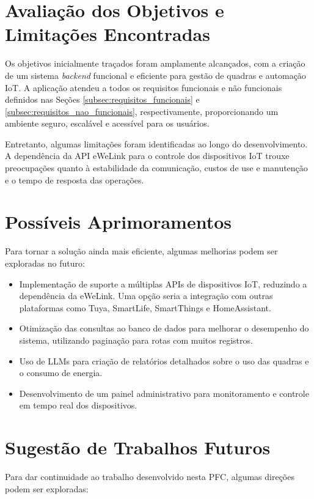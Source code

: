 \section{Avaliação dos Objetivos e Limitações Encontradas}

Os objetivos inicialmente traçados foram amplamente alcançados, com a criação de um sistema \textit{backend} funcional e eficiente para gestão de quadras e automação \acrshort{IoT}. A aplicação atendeu a todos os requisitos funcionais e não funcionais definidos nas Seções \ref{subsec:requisitos_funcionais} e \ref{subsec:requisitos_nao_funcionais}, respectivamente, proporcionando um ambiente seguro, escalável e acessível para os usuários.

Entretanto, algumas limitações foram identificadas ao longo do desenvolvimento. A dependência da API eWeLink para o controle dos dispositivos \acrshort{IoT} trouxe preocupações quanto à estabilidade da comunicação, custos de use e manutenção e o tempo de resposta das operações.

\section{Possíveis Aprimoramentos}

Para tornar a solução ainda mais eficiente, algumas melhorias podem ser exploradas no futuro:

\begin{itemize}
  \item Implementação de suporte a múltiplas APIs de dispositivos \acrshort{IoT}, reduzindo a dependência da eWeLink. Uma opção seria a integração com outras plataformas como Tuya, SmartLife, SmartThings e HomeAssistant.
  \item Otimização das consultas ao banco de dados para melhorar o desempenho do sistema, utilizando paginação para rotas com muitos registros.
  \item Uso de \acrfull{LLMs} para criação de relatórios detalhados sobre o uso das quadras e o consumo de energia.
  \item Desenvolvimento de um painel administrativo para monitoramento e controle em tempo real dos dispositivos.
\end{itemize}

\section{Sugestão de Trabalhos Futuros}

Para dar continuidade ao trabalho desenvolvido nesta \acrshort{PFC}, algumas direções podem ser exploradas:

